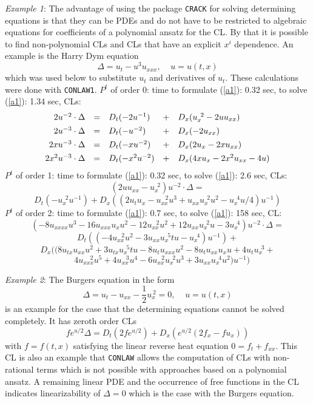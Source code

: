 {\it Example 1}: \newline 
The advantage of using the package {\tt CRACK} for solving
determining equations is that they can be PDEs and do not have to be
restricted to algebraic equations for coefficients of a polynomial
ansatz for the CL. By that it is possible to find non-polynomial
CLs and CLs that have an explicit $x^i$ dependence.
An example is the Harry Dym equation
\[ \Delta = u_{t} - u^3u_{xxx}, \;\;\;\; u = u(t,x) \]
which was used below to substitute $u_{t}$ and derivatives of 
$u_{t}$. These calculations were done with {\tt CONLAW1}.\newline
$P^t$ of order 0: time to formulate (\ref{a1}): 0.32 sec, to solve (\ref{a1}):
1.34 sec, CLs:
\[ \begin{array}{rclcl}
2u^{-2} \cdot \Delta & = & D_t(-2u^{-1}) & + & D_x(u_{x}^{\;\,2}-2uu_{xx}) \vspace{1.5mm} \\
2u^{-3} \cdot \Delta & = & D_t(-u^{-2}) & + & D_x(-2u_{xx}) \vspace{1.5mm} \\
2xu^{-3} \cdot \Delta & = & D_t(-xu^{-2}) & + & D_x(2u_{x}-2xu_{xx}) \vspace{1.5mm} \\
2x^2u^{-3} \cdot \Delta & = & D_t(-x^2u^{-2}) & + & D_x(4xu_{x}-2x^2u_{xx}-4u)
\end{array} \]
$P^t$ of order 1: time to formulate (\ref{a1}): 0.32 sec, to solve (\ref{a1}):
2.6 sec, CLs: 
\[(2uu_{xx}-u_{x}^{\;\,2})u^{-2} \cdot \Delta = \]
\[D_t(-u_{x}^{\;\,2}u^{-1}) +
  D_x((2u_{t}u_{x}-u_{xx}^{\;\;\,2}u^3+
    u_{xx}u_{x}^{\;\,2}u^2-u_{x}^{\;\,4}u/4)u^{-1}) \]
$P^t$ of order 2: time to formulate (\ref{a1}): 0.7 sec, to solve (\ref{a1}):
158 sec, CL: 
\[
(-8u_{xxxx}u^3-16u_{xxx}u_{x}u^2-12u_{xx}^{\;\;\,2}u^2
 +12u_{xx}u_{x}^{\;\,2}u-3u_{x}^{\;\,4})u^{-2} \cdot \Delta = \]
\[D_t((-4u_{xx}^{\;\;\,2}u^2-3u_{xx}u_{x}^{\;\,5}tu-u_{x}^{\;\,4})u^{-1}) + \] 
\[D_x((8u_{tx}u_{xx}u^2+3u_{tx}u_{x}^{\;\,5}tu-8u_{t}u_{xxx}u^2
  -8u_{t}u_{xx}u_{x}u+4u_{t}u_{x}^{\;\,3}+\]
\[\;\;\;\,4u_{xxx}^{\;\;\;\,\,2}u^5
  +4u_{xx}^{\;\;\,3}u^4
  -6u_{xx}^{\;\;\,2}u_{x}^{\;\,2}u^3+3u_{xx}u_{x}^{\;\,4}u^2
 )u^{-1})
\]

{\it Example 2}: \newline 
The Burgers equation in the form
\begin{equation}
 \Delta = u_t - u_{xx} - \frac{1}{2}u_x^{\,2} = 0, \;\;\;\; u = u(t,x)
 \label{BE1}
\end{equation} 
is an example for the case that the determining equations cannot be
solved completely. It has zeroth order CLs
\begin{equation}
 fe^{u/2}\Delta = D_t(2fe^{u/2}) + D_x(e^{u/2}(2f_x-fu_x)) \label{BE1cl}
\end{equation}
with $f = f(t,x)$ satisfying the linear reverse heat equation
$0 = f_t + f_{xx}.$ 
This CL is also an example that {\tt CONLAW} allows the computation
of CLs with non-rational terms which is not possible with
approaches based on a polynomial ansatz.
A remaining linear PDE and the occurrence of free 
functions in the CL indicates linearizability of $\Delta=0$ which
is the case with the Burgers equation. 

